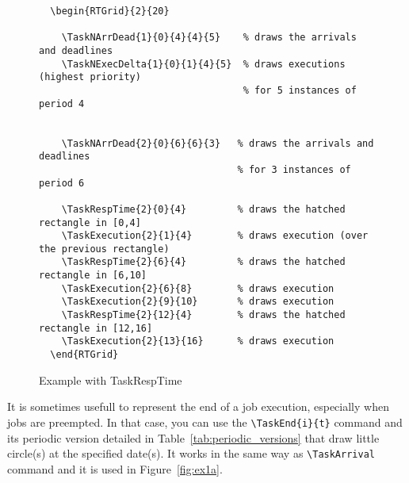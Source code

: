 \documentclass{article}
\begin{document}
\begin{figure}[!htbp]
  \centering
  \begin{RTGrid}{2}{20}
  

 

  \end{RTGrid}  
\begin{verbatim}
  \begin{RTGrid}{2}{20}
  
    \TaskNArrDead{1}{0}{4}{4}{5}    % draws the arrivals and deadlines
    \TaskNExecDelta{1}{0}{1}{4}{5}  % draws executions (highest priority) 
                                    % for 5 instances of period 4 

 
    \TaskNArrDead{2}{0}{6}{6}{3}   % draws the arrivals and deadlines
                                   % for 3 instances of period 6 

    \TaskRespTime{2}{0}{4}         % draws the hatched rectangle in [0,4]
    \TaskExecution{2}{1}{4}        % draws execution (over the previous rectangle)
    \TaskRespTime{2}{6}{4}         % draws the hatched rectangle in [6,10]
    \TaskExecution{2}{6}{8}        % draws execution
    \TaskExecution{2}{9}{10}       % draws execution
    \TaskRespTime{2}{12}{4}        % draws the hatched rectangle in [12,16]
    \TaskExecution{2}{13}{16}      % draws execution   
  \end{RTGrid}   
\end{verbatim}
  \caption{Example with TaskRespTime}
  \label{fig:resp-time}
\end{figure}

It is sometimes usefull to represent the end of a job execution, especially when jobs are preempted. In that case, you can use the \verb+\TaskEnd{i}{t}+ command and its periodic version detailed in Table~\ref{tab:periodic_versions} that draw little circle(s) at the specified date(s). It works in the same way as \verb+\TaskArrival+ command and it is used in Figure~\ref{fig:ex1a}.
\end{document}
